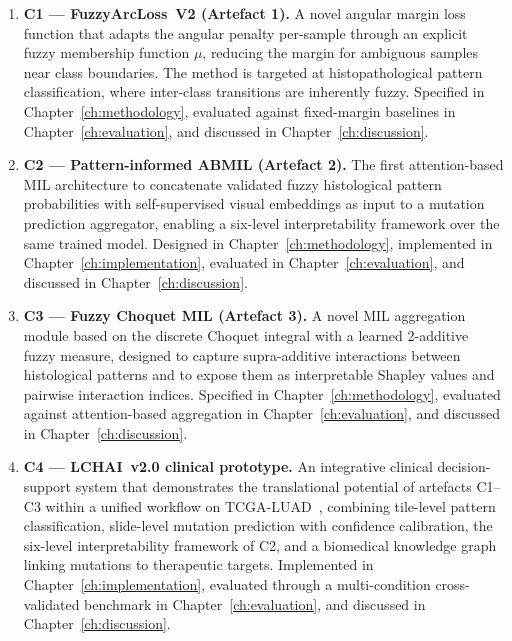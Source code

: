 \begin{enumerate}
    \item \textbf{C1 --- FuzzyArcLoss~V2 (Artefact 1).}
    A novel angular margin loss function that adapts the angular
    penalty per-sample through an explicit fuzzy membership function
    $\mu$, reducing the margin for ambiguous samples near class
    boundaries.
    The method is targeted at histopathological pattern classification,
    where inter-class transitions are inherently fuzzy.
    Specified in Chapter~\ref{ch:methodology}, evaluated against
    fixed-margin baselines in Chapter~\ref{ch:evaluation}, and
    discussed in Chapter~\ref{ch:discussion}.

    \item \textbf{C2 --- Pattern-informed ABMIL (Artefact 2).}
    The first attention-based MIL architecture to concatenate
    validated fuzzy histological pattern probabilities with
    self-supervised visual embeddings as input to a mutation
    prediction aggregator, enabling a six-level interpretability
    framework over the same trained model.
    Designed in Chapter~\ref{ch:methodology}, implemented in
    Chapter~\ref{ch:implementation}, evaluated in
    Chapter~\ref{ch:evaluation}, and discussed in
    Chapter~\ref{ch:discussion}.

    \item \textbf{C3 --- Fuzzy Choquet MIL (Artefact 3).}
    A novel MIL aggregation module based on the discrete Choquet
    integral with a learned 2-additive fuzzy measure, designed to
    capture supra-additive interactions between histological patterns
    and to expose them as interpretable Shapley values and pairwise
    interaction indices.
    Specified in Chapter~\ref{ch:methodology}, evaluated against
    attention-based aggregation in Chapter~\ref{ch:evaluation}, and
    discussed in Chapter~\ref{ch:discussion}.

    \item \textbf{C4 --- LCHAI~v2.0 clinical prototype.}
    An integrative clinical decision-support system that demonstrates
    the translational potential of artefacts C1--C3 within a unified
    workflow on TCGA-LUAD~\cite{tcga2014luad}, combining tile-level
    pattern classification, slide-level mutation prediction with
    confidence calibration, the six-level interpretability framework
    of C2, and a biomedical knowledge graph linking mutations to
    therapeutic targets.
    Implemented in Chapter~\ref{ch:implementation}, evaluated through
    a multi-condition cross-validated benchmark in
    Chapter~\ref{ch:evaluation}, and discussed in
    Chapter~\ref{ch:discussion}.


\end{enumerate}
